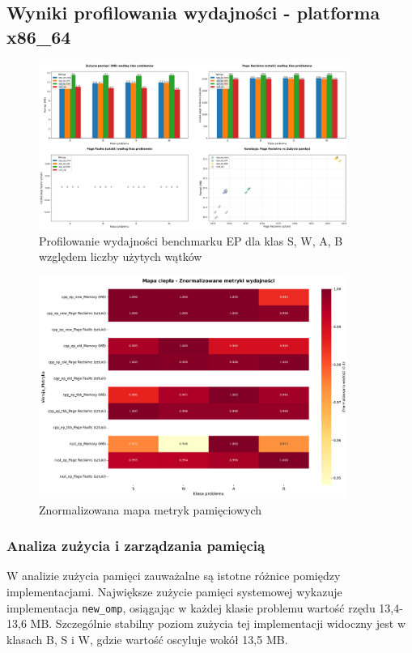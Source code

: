 \subsection{Wyniki profilowania wydajności - platforma x86\_64}
\begin{figure}[H]
    \centering
    \includegraphics[width=0.9\textwidth]{analiza/images/parallel/ep/x86/chart_01_memory_comparison.png}
    \caption{Profilowanie wydajności benchmarku EP dla klas S, W, A, B względem liczby użytych wątków}
    \label{ep_porownanie_zuzycia_pamieci_x86_64}
\end{figure}
\begin{figure}[H]
    \centering
    \includegraphics[width=0.9\textwidth]{analiza/images/parallel/ep/x86/chart_03_heatmap.png}
    \caption{Znormalizowana mapa metryk pamięciowych}
    \label{ep_znormalizowana_mapa_metryk}
\end{figure}
\subsubsection{Analiza zużycia i zarządzania pamięcią}
W analizie zużycia pamięci zauważalne są istotne różnice pomiędzy implementacjami. Największe zużycie pamięci systemowej wykazuje implementacja \texttt{new\_omp}, osiągając w każdej klasie problemu wartość rzędu 13,4-13,6 MB. Szczególnie stabilny poziom zużycia tej implementacji widoczny jest w klasach B, S i W, gdzie wartość oscyluje wokół 13,5 MB.

